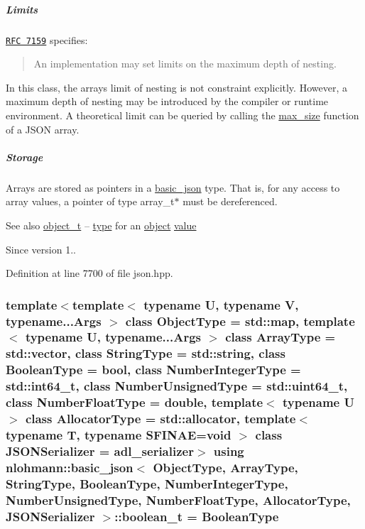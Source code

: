 \subparagraph*{Limits}

\href{http://rfc7159.net/rfc7159}{\tt R\+FC 7159} specifies\+: \begin{quote}
An implementation may set limits on the maximum depth of nesting. \end{quote}


In this class, the array\textquotesingle{}s limit of nesting is not constraint explicitly. However, a maximum depth of nesting may be introduced by the compiler or runtime environment. A theoretical limit can be queried by calling the \hyperlink{classnlohmann_1_1basic__json_a2f47d3c6a441c57dd2be00449fbb88e1}{max\+\_\+size} function of a J\+S\+ON array.

\subparagraph*{Storage}

Arrays are stored as pointers in a \hyperlink{classnlohmann_1_1basic__json}{basic\+\_\+json} type. That is, for any access to array values, a pointer of type {\ttfamily array\+\_\+t$\ast$} must be dereferenced.

\begin{DoxySeeAlso}{See also}
\hyperlink{classnlohmann_1_1basic__json_a3cdea044cc3ecba1c4f9874a89daf6e4}{object\+\_\+t} -- \hyperlink{classnlohmann_1_1basic__json_a2b2d781d7f2a4ee41bc0016e931cadf7}{type} for an \hyperlink{classnlohmann_1_1basic__json_aa13f7c0615867542ce80337cbcf13ada}{object} \hyperlink{classnlohmann_1_1basic__json_a9fa223b26419f018f9b18cc516e3a8e5}{value}
\end{DoxySeeAlso}
\begin{DoxySince}{Since}
version 1.. 
\end{DoxySince}


Definition at line 7700 of file json.\+hpp.

\subsubsection[{\texorpdfstring{boolean\+\_\+t}{boolean_t}}]{\setlength{\rightskip}{0pt plus 5cm}template$<$template$<$ typename U, typename V, typename...\+Args $>$ class Object\+Type = std\+::map, template$<$ typename U, typename...\+Args $>$ class Array\+Type = std\+::vector, class String\+Type  = std\+::string, class Boolean\+Type  = bool, class Number\+Integer\+Type  = std\+::int64\+\_\+t, class Number\+Unsigned\+Type  = std\+::uint64\+\_\+t, class Number\+Float\+Type  = double, template$<$ typename U $>$ class Allocator\+Type = std\+::allocator, template$<$ typename T, typename S\+F\+I\+N\+A\+E=void $>$ class J\+S\+O\+N\+Serializer = adl\+\_\+serializer$>$ using {\bf nlohmann\+::basic\+\_\+json}$<$ Object\+Type, Array\+Type, String\+Type, Boolean\+Type, Number\+Integer\+Type, Number\+Unsigned\+Type, Number\+Float\+Type, Allocator\+Type, J\+S\+O\+N\+Serializer $>$\+::{\bf boolean\+\_\+t} =  Boolean\+Type}\hypertarget{classnlohmann_1_1basic__json_a4c919102a9b4fe0d588af64801436082}{}\label{classnlohmann_1_1basic__json_a4c919102a9b4fe0d588af64801436082}


